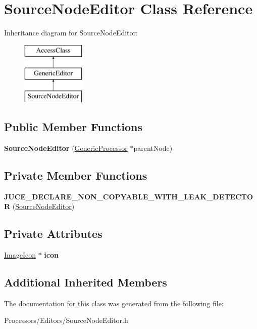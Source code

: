 \hypertarget{classSourceNodeEditor}{\section{Source\-Node\-Editor Class Reference}
\label{classSourceNodeEditor}
}
Inheritance diagram for Source\-Node\-Editor\-:\begin{figure}[H]
\begin{center}
\leavevmode
\includegraphics[height=3.000000cm]{classSourceNodeEditor}
\end{center}
\end{figure}
\subsection*{Public Member Functions}
\begin{DoxyCompactItemize}
\item 
\hypertarget{classSourceNodeEditor_af74a126037071a0c7fd2030002248be2}{{\bfseries Source\-Node\-Editor} (\hyperlink{classGenericProcessor}{Generic\-Processor} $\ast$parent\-Node)}\label{classSourceNodeEditor_af74a126037071a0c7fd2030002248be2}

\end{DoxyCompactItemize}
\subsection*{Private Member Functions}
\begin{DoxyCompactItemize}
\item 
\hypertarget{classSourceNodeEditor_a40ac7dcad332a57a292e69cc9aaf6232}{{\bfseries J\-U\-C\-E\-\_\-\-D\-E\-C\-L\-A\-R\-E\-\_\-\-N\-O\-N\-\_\-\-C\-O\-P\-Y\-A\-B\-L\-E\-\_\-\-W\-I\-T\-H\-\_\-\-L\-E\-A\-K\-\_\-\-D\-E\-T\-E\-C\-T\-O\-R} (\hyperlink{classSourceNodeEditor}{Source\-Node\-Editor})}\label{classSourceNodeEditor_a40ac7dcad332a57a292e69cc9aaf6232}

\end{DoxyCompactItemize}
\subsection*{Private Attributes}
\begin{DoxyCompactItemize}
\item 
\hypertarget{classSourceNodeEditor_a31670f7b441dfe1d0f639256ac7f0fc6}{\hyperlink{classImageIcon}{Image\-Icon} $\ast$ {\bfseries icon}}\label{classSourceNodeEditor_a31670f7b441dfe1d0f639256ac7f0fc6}

\end{DoxyCompactItemize}
\subsection*{Additional Inherited Members}


The documentation for this class was generated from the following file\-:\begin{DoxyCompactItemize}
\item 
Processors/\-Editors/Source\-Node\-Editor.\-h\end{DoxyCompactItemize}
